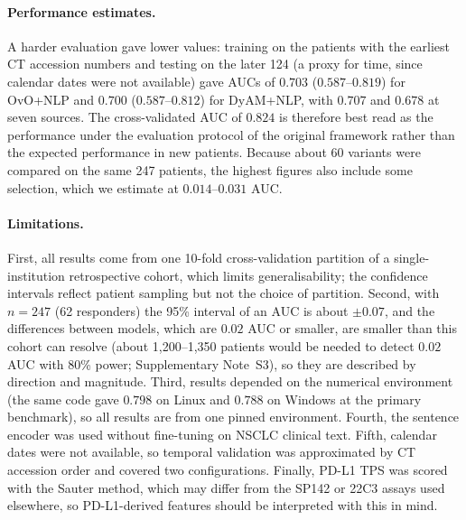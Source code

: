 \paragraph{Performance estimates.}
A harder evaluation gave lower values: training on the patients with the earliest CT accession numbers and testing on the later 124
(a proxy for time, since calendar dates were not available) gave AUCs of $0.703$ ($0.587$--$0.819$) for OvO+NLP and $0.700$ ($0.587$--$0.812$) for
DyAM+NLP, with $0.707$ and $0.678$ at seven sources. The cross-validated AUC of $0.824$ is therefore best read as the performance
under the evaluation protocol of the original framework rather than the expected performance in new patients. Because about 60 variants were compared on
the same 247 patients, the highest figures also include some selection, which we estimate at $0.014$--$0.031$ AUC.

\paragraph{Limitations.}
First, all results come from one 10-fold cross-validation partition of a single-institution retrospective cohort, which limits generalisability;
the confidence intervals reflect patient sampling but not the choice of partition.
Second, with $n = 247$ (62 responders) the 95\% interval of an AUC is about $\pm 0.07$, and the differences between models, which are
$0.02$ AUC or smaller, are smaller than this cohort can resolve (about 1{,}200--1{,}350 patients would be needed to detect $0.02$ AUC with 80\% power;
Supplementary Note~S3), so they are described by direction and magnitude.
Third, results depended on the numerical environment (the same code gave $0.798$ on Linux and $0.788$ on Windows at the primary benchmark), so all results
are from one pinned environment.
Fourth, the sentence encoder was used without fine-tuning on NSCLC clinical text.
Fifth, calendar dates were not available, so temporal validation was approximated by CT accession order and covered two configurations.
Finally, PD-L1 TPS was scored with the Sauter method, which may differ from the SP142 or 22C3 assays used elsewhere, so PD-L1-derived
features should be interpreted with this in mind.
